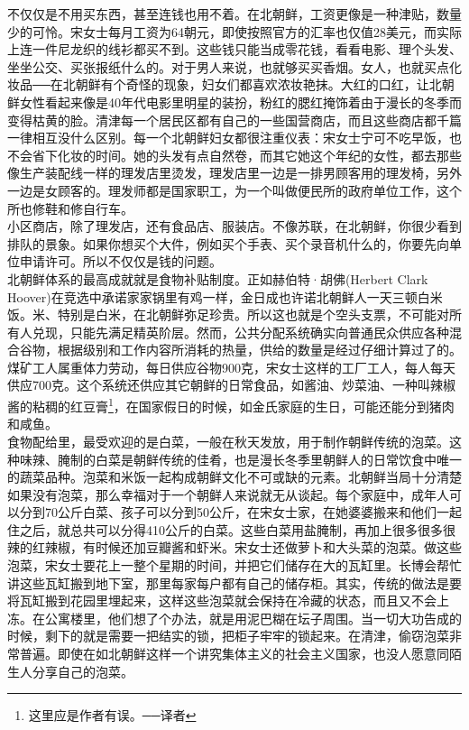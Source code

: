 \begin{multicols}{\theparacolNo}
不仅仅是不用买东西，甚至连钱也用不着。在北朝鲜，工资更像是一种津贴，数量少的可怜。宋女士每月工资为64朝元，即使按照官方的汇率也仅值28美元，而实际上连一件尼龙织的线衫都买不到。这些钱只能当成零花钱，看看电影、理个头发、坐坐公交、买张报纸什么的。对于男人来说，也就够买买香烟。女人，也就买点化妆品──在北朝鲜有个奇怪的现象，妇女们都喜欢浓妆艳抹。大红的口红，让北朝鲜女性看起来像是40年代电影里明星的装扮，粉红的腮红掩饰着由于漫长的冬季而变得枯黄的脸。清津每一个居民区都有自己的一些国营商店，而且这些商店都千篇一律相互没什么区别。每一个北朝鲜妇女都很注重仪表：宋女士宁可不吃早饭，也不会省下化妆的时间。她的头发有点自然卷，而其它她这个年纪的女性，都去那些像生产装配线一样的理发店里烫发，理发店里一边是一排男顾客用的理发椅，另外一边是女顾客的。理发师都是国家职工，为一个叫做便民所的政府单位工作，这个所也修鞋和修自行车。\\

小区商店，除了理发店，还有食品店、服装店。不像苏联，在北朝鲜，你很少看到排队的景象。如果你想买个大件，例如买个手表、买个录音机什么的，你要先向单位申请许可。所以不仅仅是钱的问题。\\

北朝鲜体系的最高成就就是食物补贴制度。正如赫伯特·胡佛(Herbert Clark Hoover)在竞选中承诺家家锅里有鸡一样，金日成也许诺北朝鲜人一天三顿白米饭。米、特别是白米，在北朝鲜弥足珍贵。所以这也就是个空头支票，不可能对所有人兑现，只能先满足精英阶层。然而，公共分配系统确实向普通民众供应各种混合谷物，根据级别和工作内容所消耗的热量，供给的数量是经过仔细计算过了的。煤矿工人属重体力劳动，每日供应谷物900克，宋女士这样的工厂工人，每人每天供应700克。这个系统还供应其它朝鲜的日常食品，如酱油、炒菜油、一种叫辣椒酱的粘稠的红豆膏\footnote{这里应是作者有误。──译者}，在国家假日的时候，如金氏家庭的生日，可能还能分到猪肉和咸鱼。\\

食物配给里，最受欢迎的是白菜，一般在秋天发放，用于制作朝鲜传统的泡菜。这种味辣、腌制的白菜是朝鲜传统的佳肴，也是漫长冬季里朝鲜人的日常饮食中唯一的蔬菜品种。泡菜和米饭一起构成朝鲜文化不可或缺的元素。北朝鲜当局十分清楚如果没有泡菜，那么幸福对于一个朝鲜人来说就无从谈起。每个家庭中，成年人可以分到70公斤白菜、孩子可以分到50公斤，在宋女士家，在她婆婆搬来和他们一起住之后，就总共可以分得410公斤的白菜。这些白菜用盐腌制，再加上很多很多很辣的红辣椒，有时候还加豆瓣酱和虾米。宋女士还做萝卜和大头菜的泡菜。做这些泡菜，宋女士要花上一整个星期的时间，并把它们储存在大的瓦缸里。长博会帮忙讲这些瓦缸搬到地下室，那里每家每户都有自己的储存柜。其实，传统的做法是要将瓦缸搬到花园里埋起来，这样这些泡菜就会保持在冷藏的状态，而且又不会上冻。在公寓楼里，他们想了个办法，就是用泥巴糊在坛子周围。当一切大功告成的时候，剩下的就是需要一把结实的锁，把柜子牢牢的锁起来。在清津，偷窃泡菜非常普遍。即使在如北朝鲜这样一个讲究集体主义的社会主义国家，也没人愿意同陌生人分享自己的泡菜。\\


\end{multicols}
